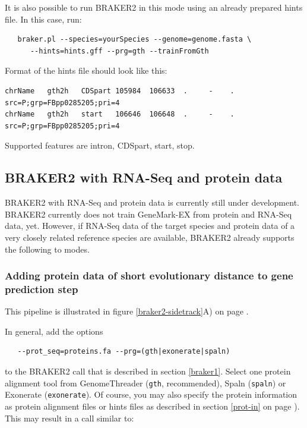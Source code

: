 \documentclass[a4paper,10pt]{report}
\begin{document}
It is also possible to run BRAKER2 in this mode using an already prepared hints file. In this case, run:

\begin{verbatim}
   braker.pl --species=yourSpecies --genome=genome.fasta \
      --hints=hints.gff --prg=gth --trainFromGth
\end{verbatim}

Format of the hints file should look like this:

\begin{verbatim}
chrName   gth2h   CDSpart 105984  106633  .     -    .    src=P;grp=FBpp0285205;pri=4
chrName   gth2h   start   106646  106648  .     -    .    src=P;grp=FBpp0285205;pri=4
\end{verbatim}

Supported features are intron, CDSpart, start, stop.

\subsection{BRAKER2 with RNA-Seq and protein data}

BRAKER2 with RNA-Seq and protein data is currently still under development. BRAKER2 currently does not train GeneMark-EX from protein and RNA-Seq data, yet. However, if RNA-Seq data of the target species and protein data of a very closely related reference species are available, BRAKER2 already supports the following to modes.

\subsubsection{Adding protein data of short evolutionary distance to gene prediction step}

This pipeline is illustrated in figure \ref{braker2-sidetrack}A) on page \pageref{braker2-sidetrack}.

In general, add the options

\begin{verbatim}
   --prot_seq=proteins.fa --prg=(gth|exonerate|spaln)
\end{verbatim}

to the BRAKER2 call that is described in section \ref{braker1}. Select one protein alignment tool from GenomeThreader (\texttt{gth}, recommended), Spaln (\texttt{spaln}) or Exonerate (\texttt{exonerate}). Of course, you may also specify the protein information as protein alignment files or hints files as described in section \ref{prot-in} on page \pageref{prot-in}). This may result in a call similar to:
\end{document}
